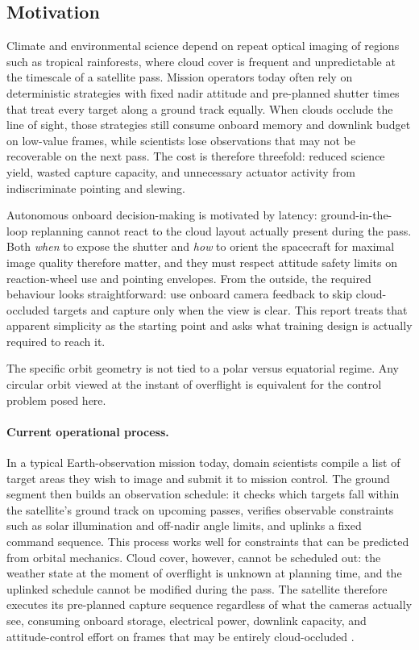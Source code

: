 \subsection{Motivation}
Climate and environmental science depend on repeat optical imaging of regions such as tropical rainforests, where cloud cover is frequent and unpredictable at the timescale of a satellite pass.
Mission operators today often rely on deterministic strategies with fixed nadir attitude and pre-planned shutter times that treat every target along a ground track equally.
When clouds occlude the line of sight, those strategies still consume onboard memory and downlink budget on low-value frames, while scientists lose observations that may not be recoverable on the next pass.
The cost is therefore threefold: reduced science yield, wasted capture capacity, and unnecessary actuator activity from indiscriminate pointing and slewing.

Autonomous onboard decision-making is motivated by latency: ground-in-the-loop replanning cannot react to the cloud layout actually present during the pass.
Both \emph{when} to expose the shutter and \emph{how} to orient the spacecraft for maximal image quality therefore matter, and they must respect attitude safety limits on reaction-wheel use and pointing envelopes.
From the outside, the required behaviour looks straightforward: use onboard camera feedback to skip cloud-occluded targets and capture only when the view is clear.
This report treats that apparent simplicity as the starting point and asks what training design is actually required to reach it.

The specific orbit geometry is not tied to a polar versus equatorial regime.
Any circular orbit viewed at the instant of overflight is equivalent for the control problem posed here.

\paragraph{Current operational process.}
In a typical Earth-observation mission today, domain scientists compile a list of target areas they wish to image and submit it to mission control.
The ground segment then builds an observation schedule: it checks which targets fall within the satellite's ground track on upcoming passes, verifies observable constraints such as solar illumination and off-nadir angle limits, and uplinks a fixed command sequence.
This process works well for constraints that can be predicted from orbital mechanics.
Cloud cover, however, cannot be scheduled out: the weather state at the moment of overflight is unknown at planning time, and the uplinked schedule cannot be modified during the pass.
The satellite therefore executes its pre-planned capture sequence regardless of what the cameras actually see, consuming onboard storage, electrical power, downlink capacity, and attitude-control effort on frames that may be entirely cloud-occluded \citep{ferrari2024ssp}.

